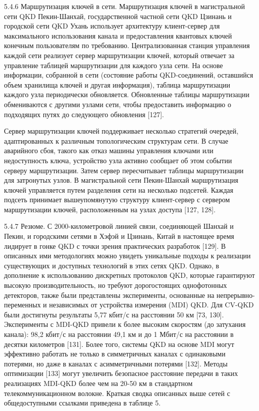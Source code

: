 5.4.6 Маршрутизация ключей в сети. Маршрутизация ключей в магистральной сети QKD Пекин-Шанхай, государственной частной сети QKD Цзинань и городской сети QKD Ухань использует архитектуру клиент-сервер для максимального использования канала и предоставления квантовых ключей конечным пользователям по требованию.
Централизованная станция управления каждой сети реализует сервер маршрутизации ключей, который отвечает за управление таблицей маршрутизации для каждого узла сети. На основе информации, собранной в сети (состояние работы QKD-соединений, оставшийся объем хранилища ключей и другая информация), таблица маршрутизации каждого узла периодически обновляется. Обновленные таблицы маршрутизации обмениваются с другими узлами сети, чтобы предоставить информацию о подходящих путях до следующего обновления [127].

Сервер маршрутизации ключей поддерживает несколько стратегий очередей, адаптированных к различным топологическим структурам сети. В случае аварийного сбоя, такого как отказ машины управления ключами или недоступность ключа, устройство узла активно сообщает об этом событии серверу маршрутизации.
Затем сервер пересчитывает таблицы маршрутизации для затронутых узлов. В магистральной сети Пекин-Шанхай маршрутизация ключей управляется путем разделения сети на несколько подсетей. Каждая подсеть принимает вышеупомянутую структуру клиент-сервер с сервером маршрутизации ключей, расположенным на узлах доступа [127, 128].

5.4.7 Резюме. С 2000-километровой линией связи, соединяющей Шанхай и Пекин, и городскими сетями в Хэфэй и Цзинань, Китай в настоящее время лидирует в гонке QKD с точки зрения практических разработок [129]. В описанных ими методологиях можно увидеть уникальные подходы к реализации существующих и доступных технологий в этих сетях QKD. Однако, в дополнение к использованию дискретных протоколов QKD, которые гарантируют высокую производительность, но требуют дорогостоящих однофотонных детекторов, также были представлены эксперименты, основанные на непрерывно-переменных и независимых от устройства измерения (MDI) QKD. Для CV-QKD были достигнуты результаты 5,77 кбит/с на расстоянии 50 км [73, 130]. Эксперименты с MDI-QKD привели к более высоким скоростям (до затухания канала): 98,2 кбит/с на расстоянии 49,1 км и до 1 Мбит/с на расстоянии в десятки километров [131]. Более того, системы QKD на основе MDI могут эффективно работать не только в симметричных каналах с одинаковыми потерями, но даже в каналах с асимметричными потерями [132]. Методы оптимизации [133] могут увеличить безопасное расстояние передачи в таких реализациях MDI-QKD более чем на 20-50 км в стандартном телекоммуникационном волокне. Краткая сводка описанных выше сетей с общедоступными ссылками приведена в таблице 5.

